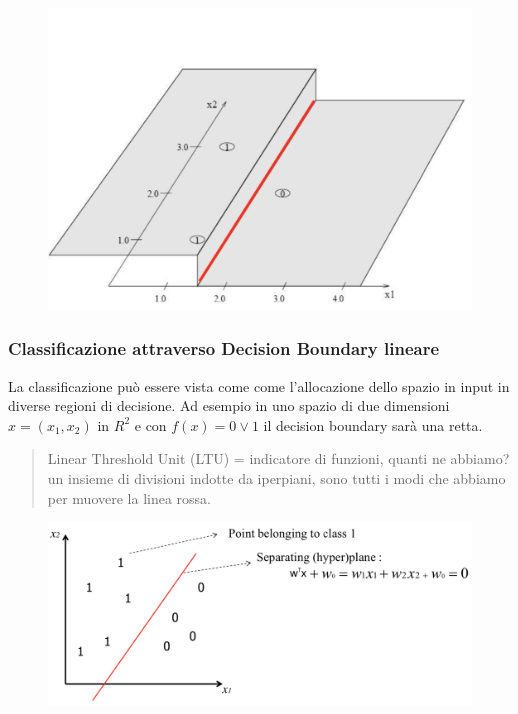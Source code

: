 \documentclass{article}
\begin{document}
\begin{figure}[H]
\centering
\includegraphics[scale=0.4]{Images/classificationplane.png}
\end{figure}

\subsubsection{Classificazione attraverso Decision Boundary lineare}
La classificazione può essere vista come come l'allocazione dello spazio in input in diverse regioni di decisione. Ad esempio in uno spazio di due dimensioni $x=(x_1,x_2)$ in $R^2$ e con $f(x) = 0 \lor 1$ il decision boundary sarà una retta. 
\begin{quote}
    Linear Threshold Unit (LTU) = indicatore di funzioni, quanti ne abbiamo? un insieme di divisioni indotte da iperpiani, sono tutti i modi che abbiamo per muovere la linea rossa.
\end{quote}
\begin{figure}[H]
\centering
\includegraphics[scale=0.5]{Images/lineardecisionboundary.png}
\end{figure}
\end{document}
